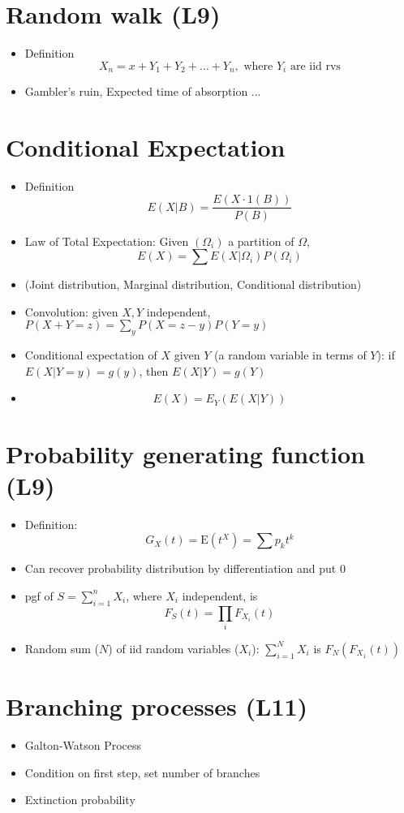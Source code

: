 \section{Random walk (L9)}
\begin{itemize}
      \item Definition \[X_n = x + Y_1 + Y_2 + \dots + Y_n, \text{ where } Y_i \text{ are iid rvs}\]
      \item Gambler's ruin, Expected time of absorption ...
\end{itemize}


\section{Conditional Expectation}
\begin{itemize}
      \item Definition \[E(X|B) = \frac {E(X \cdot 1(B))}{P(B)} \]
      \item Law of Total Expectation: Given $(\Omega_i)$ a partition of $\Omega$, \[E(X) = \sum E(X|\Omega_i)P(\Omega_i)\]
      \item (Joint distribution, Marginal distribution, Conditional distribution)
      \item Convolution: given $X,Y$ independent, $P(X+Y=z) = \sum_y P(X=z-y)P(Y=y) $
      \item Conditional expectation of $X$ given $Y$ (a random variable in terms of $Y$): if $E(X | Y=y) = g(y)$, then $E(X|Y) = g(Y)$
      \item \[E(X) = E_Y(E(X|Y))\]
\end{itemize}

\section{Probability generating function (L9)}
\begin{itemize}
      \item Definition: \[G_X(t) = \text{E}(t^X) = \sum p_k t^k \]
      \item Can recover probability distribution by differentiation and put $0$
      \item pgf of $S = \sum_{i=1}^n X_i$, where $X_i$ independent, is
            \[F_S(t) = \prod_i F_{X_i}(t)\]
      \item Random sum ($N$) of iid random variables ($X_i$): $\sum_{i=1}^N X_i$ is $F_N(F_{X_1}(t))$
\end{itemize}

\section{Branching processes (L11)}
\begin{itemize}
      \item Galton-Watson Process
      \item Condition on first step, set number of branches
      \item Extinction probability
\end{itemize}

